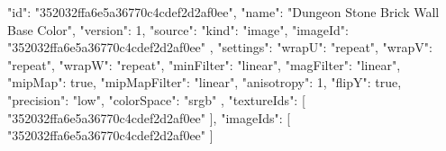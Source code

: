 {
  "id": "352032ffa6e5a36770c4cdef2d2af0ee",
  "name": "Dungeon Stone Brick Wall Base Color",
  "version": 1,
  "source": {
    "kind": "image",
    "imageId": "352032ffa6e5a36770c4cdef2d2af0ee"
  },
  "settings": {
    "wrapU": "repeat",
    "wrapV": "repeat",
    "wrapW": "repeat",
    "minFilter": "linear",
    "magFilter": "linear",
    "mipMap": true,
    "mipMapFilter": "linear",
    "anisotropy": 1,
    "flipY": true,
    "precision": "low",
    "colorSpace": "srgb"
  },
  "textureIds": [
    "352032ffa6e5a36770c4cdef2d2af0ee"
  ],
  "imageIds": [
    "352032ffa6e5a36770c4cdef2d2af0ee"
  ]
}
